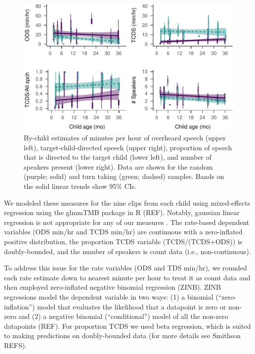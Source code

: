 \documentclass[floatsintext,man]{apa6}
\theoremstyle{definition}
\theoremstyle{definition}
\theoremstyle{definition}
\theoremstyle{remark}
\begin{document}
\begin{figure}
\centering
\includegraphics{Tseltal-CLE_files/figure-latex/fig1-1.pdf}
\caption{\label{fig:fig1}By-child estimates of minutes per hour of overheard
speech (upper left), target-child-directed speech (upper right),
proportion of speech that is directed to the target child (lower left),
and number of speakers present (lower right). Data are shown for the
random (purple; solid) and turn taking (green; dashed) samples. Bands on
the solid linear trends show 95\% CIs.}
\end{figure}

We modeled these measures for the nine clips from each child using
mixed-effects regression using the glmmTMB package in R (REF). Notably,
gaussian linear regression is not appropriate for any of our measures .
The rate-based dependent variables (ODS min/hr and TCDS min/hr) are
continuous with a zero-inflated positive distribution, the proportion
TCDS variable (TCDS/(TCDS+ODS)) is doubly-bounded, and the number of
speakers is count data (i.e., non-continuous).

To address this issue for the rate variables (ODS and TDS min/hr), we
rounded each rate estimate down to nearest minute per hour to treat it
as count data and then employed zero-inflated negative binomial
regression (ZINB). ZINB regressions model the dependent variable in two
ways: (1) a binomial (\enquote{zero-inflation}) model that evaluates the
likelihood that a datapoint is zero or non-zero and (2) a negative
binomial (\enquote{conditional}) model of all the non-zero datapoints
(REF). For proportion TCDS we used beta regression, which is suited to
making predictions on doubly-bounded data (for more details see Smithson
REFS).
\end{document}

